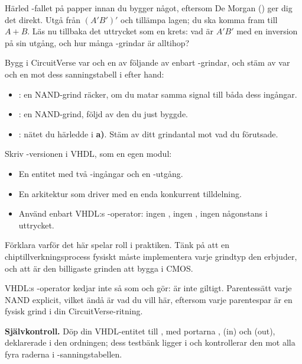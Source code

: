  Härled -fallet på papper innan du bygger något, eftersom De Morgan
() ger dig det direkt. Utgå från $(A'B')'$ och tillämpa lagen; du ska komma
fram till $A + B$. Läs nu tillbaka det uttrycket som en krets: vad är $A'B'$ med en inversion på
sin utgång, och hur många -grindar är alltihop?

 Bygg i CircuitVerse var och en av följande av enbart -grindar, och stäm av
var och en mot dess sanningstabell i  efter hand:
\begin{itemize}
  \item {}: en NAND-grind räcker, om du matar samma signal till båda dess ingångar.
  \item {}: en NAND-grind, följd av den  du just byggde.
  \item {}: nätet du härledde i \textbf{a)}. Stäm av ditt grindantal mot vad du
    förutsade.
\end{itemize}

 Skriv -versionen i VHDL, som en egen modul:
\begin{itemize}
  \item En entitet med två -ingångar och en -utgång.
  \item En arkitektur som driver  med en enda konkurrent tilldelning.
  \item Använd enbart VHDL:s -operator: ingen , ingen , ingen
     någonstans i uttrycket.
\end{itemize}

 Förklara varför det här spelar roll i praktiken. Tänk på att en chiptillverkningsprocess
fysiskt måste implementera varje grindtyp den erbjuder, och att  är den billigaste
grinden att bygga i CMOS.

\note[Tips]VHDL:s -operator kedjar inte så som  och  gör:
 är inte giltigt. Parentessätt varje NAND explicit, vilket ändå är vad du
vill här, eftersom varje parentespar är en fysisk grind i din CircuitVerse-ritning.


\begin{selfcheck}
\textbf{Självkontroll.} Döp din VHDL-entitet till , med portarna ,
 (in) och  (out), deklarerade i den ordningen; dess testbänk ligger i
 och kontrollerar den mot alla fyra raderna i
-sanningstabellen.
\end{selfcheck}

